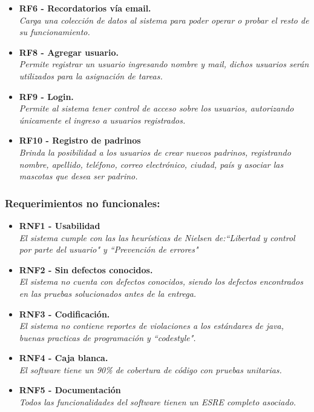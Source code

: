 \begin{itemize}
    \item \textbf{RF6 - Recordatorios vía email.} \\
    \textit{Carga una colección de datos al sistema para poder operar o probar el resto de su funcionamiento.}
    \item \textbf{RF8 - Agregar usuario.} \\
    \textit{Permite registrar un usuario ingresando nombre y mail, dichos usuarios serán utilizados para la asignación de tareas.}
    \item \textbf{RF9 - Login.} \\
    \textit{Permite al sistema tener control de acceso sobre los usuarios, autorizando únicamente el ingreso a usuarios registrados.}
    \item \textbf{RF10 - Registro de padrinos} \\
    \textit{Brinda la posibilidad a los usuarios de crear nuevos padrinos, registrando nombre, apellido, teléfono, correo electrónico, ciudad, país y asociar las mascotas que desea ser padrino.}

\end{itemize}

\subsubsection{Requerimientos no funcionales:}
\begin{itemize}
    \item \textbf{RNF1 - Usabilidad} \\
    \textit{El sistema cumple con las las heurísticas de Nielsen de:``Libertad y control por parte del usuario" y ``Prevención de errores"}
    \item \textbf{RNF2 - Sin defectos conocidos.} \\
    \textit{El sistema no cuenta con defectos conocidos, siendo los defectos encontrados en las pruebas solucionados antes de la entrega.}
    \item \textbf{RNF3 - Codificación.} \\
    \textit{El sistema no contiene reportes de violaciones a los estándares de java, buenas practicas de programación y ``codestyle".}
    \item \textbf{RNF4 - Caja blanca.} \\
    \textit{El software tiene un 90\% de cobertura de código con pruebas unitarias.}
    \item \textbf{RNF5 - Documentación} \\
    \textit{Todos las funcionalidades del software tienen un ESRE completo asociado.}
\end{itemize}
